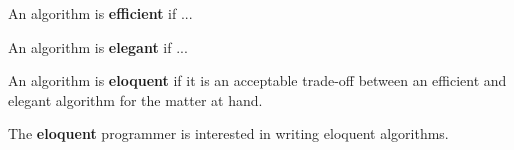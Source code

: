 \begin{notion} An algorithm is \textbf{efficient} if ... \end{notion}

\begin{notion} An algorithm is \textbf{elegant} if ... \end{notion}

\begin{notion} An algorithm is \textbf{eloquent} if it is an acceptable
trade-off between an efficient and elegant algorithm for the matter at hand.
\end{notion}

\begin{notion} The \textbf{eloquent} programmer is interested in writing
eloquent algorithms. \end{notion}
